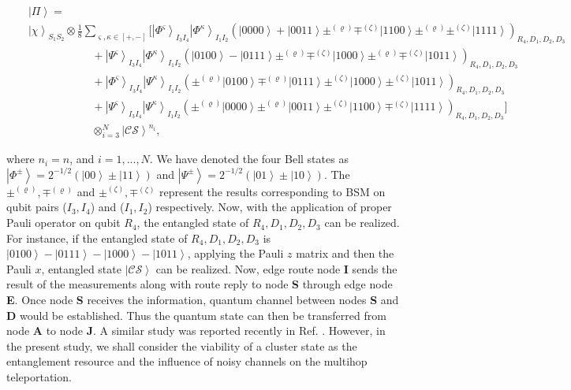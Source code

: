 \documentclass[aps,pra,twocolumn,showpacs,superscriptaddress,groupedaddress]{revtex4}
\begin{document}
\begin{widetext}
\begin{eqnarray}
&&\left|\Pi\right\rangle=\nonumber\\
&&\left|\chi\right\rangle_{S_1S_2}\otimes\frac{1}{8}\sum_{\varsigma,\kappa\in[+,-]}\bigg[\left|\Phi^\varsigma\right\rangle_{I_3I_4}\left|\Phi^\kappa\right\rangle_{I_1I_2}\left(\left|0000\right\rangle+\left|0011\right\rangle\pm^{(\varrho)}\mp^{(\zeta)}\left|1100\right\rangle\pm^{(\varrho)}\pm^{(\zeta)}\left|1111\right\rangle\right)_{R_4,D_1,D_2,D_3}\nonumber\\
&&\ \ \ \ \ \ \ \ \ \ \ \ \ \ \ \ \ \ \ \ \ \ \ \ \ \ +\left|\Psi^\varsigma\right\rangle_{I_3I_4}\left|\Phi^\kappa\right\rangle_{I_1I_2}\left(\left|0100\right\rangle-\left|0111\right\rangle\pm^{(\varrho)}\mp^{(\zeta)}\left|1000\right\rangle\pm^{(\varrho)}\mp^{(\zeta)}\left|1011\right\rangle\right)_{R_4,D_1,D_2,D_3}\nonumber\\
&&\ \ \ \ \ \ \ \ \ \ \ \ \ \ \ \ \ \ \ \ \ \ \ \ \ \ +\left|\Phi^\varsigma\right\rangle_{I_3I_4}\left|\Psi^\kappa\right\rangle_{I_1I_2}\left(\pm^{(\varrho)}\left|0100\right\rangle\mp^{(\varrho)}\left|0111\right\rangle\pm^{(\zeta)}\left|1000\right\rangle\pm^{(\zeta)}\left|1011\right\rangle\right)_{R_4,D_1,D_2,D_3}\nonumber\\
&&\ \ \ \ \ \ \ \ \ \ \ \ \ \ \ \ \ \ \ \ \ \ \ \ \ \  +\left|\Psi^\varsigma\right\rangle_{I_3I_4}\left|\Psi^\kappa\right\rangle_{I_1I_2}\left(\pm^{(\varrho)}\left|0000\right\rangle\pm^{(\varrho)}\left|0011\right\rangle\pm^{(\zeta)}\left|1100\right\rangle\mp^{(\zeta)}\left|1111\right\rangle\right)_{R_4,D_1,D_2,D_3}\bigg]\nonumber\\
&&\ \ \ \ \ \ \ \ \ \ \ \ \ \ \ \ \ \ \ \ \ \ \ \ \ \  \otimes_{i=3}^N\left|\mathcal{CS}\right\rangle^{n_i},
\label{SUS2}
\end{eqnarray}
\end{widetext}
where $n_i=n$, and $i=1,...,N$. We have denoted the four Bell states as $\left|\Phi^{\pm}\right\rangle=2^{-1/2}(\left|00\right\rangle\pm\left|11\right\rangle)$ and $\left|\Psi^{\pm}\right\rangle=2^{-1/2}(\left|01\right\rangle\pm\left|10\right\rangle)$. The $\pm^{(\varrho)}, \mp^{(\varrho)}$ and $\pm^{(\zeta)},\mp^{(\zeta)}$  represent the results corresponding to BSM on qubit pairs ($I_3,I_4$) and ($I_1,I_2$) respectively. Now, with the application of proper Pauli operator on qubit $R_4$, the entangled state of $R_4,D_1,D_2,D_3$ can be realized. For instance, if the entangled state of $R_4,D_1,D_2,D_3$ is $\left|0100\right\rangle-\left|0111\right\rangle-\left|1000\right\rangle-\left|1011\right\rangle$, applying the Pauli $z$ matrix and then the Pauli $x$, entangled state $\left|\mathcal{CS}\right\rangle$ can be realized. Now, edge route node {\bf I} sends the result of the measurements along with route reply to node {\bf S} through edge node {\bf E}. Once node {\bf S} receives the information, quantum channel between nodes {\bf S} and {\bf D} would be established. Thus the quantum state can then be transferred from node {\bf A} to node {\bf J}. A similar study was reported recently in Ref. \cite{MA3}. However, in the present study, we shall consider the viability of a cluster state as the entanglement resource and the influence of noisy channels on the multihop teleportation.
 
\end{document}
